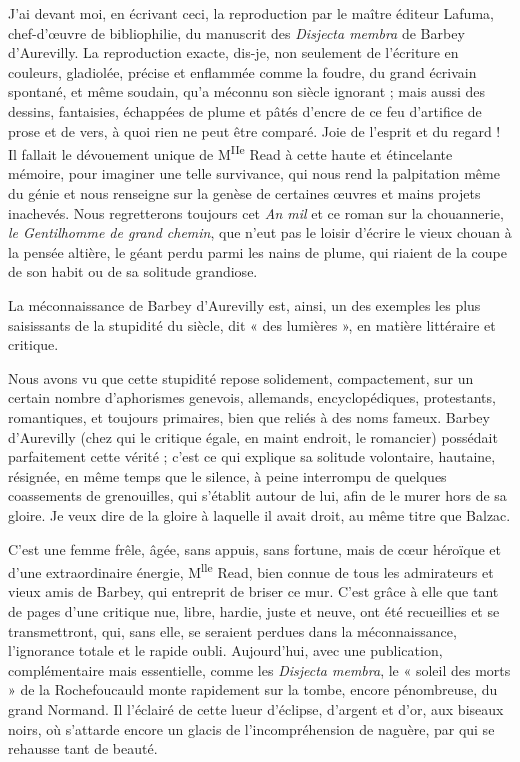 \documentclass[french,twoside]{book} %
\begin{document}
J’ai devant moi, en écrivant ceci, la reproduction par le maître éditeur Lafuma, chef-d’œuvre de bibliophilie, du manuscrit des {\itshape Disjecta membra} de Barbey d’Aurevilly. La reproduction exacte, dis-je, non seulement de l’écriture en couleurs, gladiolée, précise et enflammée comme la foudre, du grand écrivain spontané, et même soudain, qu’a méconnu son siècle ignorant ; mais aussi des dessins, fantaisies, échappées de plume et pâtés d’encre de ce feu d’artifice de prose et de vers, à quoi rien ne peut être comparé. Joie de l’esprit et du regard ! Il fallait le dévouement unique de M\textsuperscript{IIe} Read à cette haute et étincelante mémoire, pour imaginer une telle survivance, qui nous rend la palpitation même du génie et nous renseigne sur la genèse de certaines œuvres et mains projets inachevés. Nous regretterons toujours cet {\itshape An mil} et ce roman sur la chouannerie, {\itshape le Gentilhomme de grand chemin}, que n’eut pas le loisir d’écrire le vieux chouan à la pensée altière, le géant perdu parmi les nains de plume, qui riaient de la coupe de son habit ou de sa solitude grandiose.\par
La méconnaissance de Barbey d’Aurevilly est, ainsi, un des exemples les plus saisissants de la stupidité du siècle, dit « des lumières », en matière littéraire et critique.\par
Nous avons vu que cette stupidité repose solidement, compactement, sur un certain nombre d’aphorismes genevois, allemands, encyclopédiques, protestants, romantiques, et toujours primaires, bien que reliés à des noms fameux. Barbey d’Aurevilly (chez qui le critique égale, en maint endroit, le romancier) possédait parfaitement cette vérité ; c’est ce qui explique sa solitude volontaire, hautaine, résignée, en même temps que le silence, à peine interrompu de quelques coassements de grenouilles, qui s’établit autour de lui, afin de le murer hors de sa gloire. Je veux dire de la gloire à laquelle il avait droit, au même titre que Balzac.\par
C’est une femme frêle, âgée, sans appuis, sans fortune, mais de cœur héroïque et d’une extraordinaire énergie, M\textsuperscript{lle} Read, bien connue de tous les admirateurs et vieux amis de Barbey, qui entreprit de briser ce mur. C’est grâce à elle que tant de pages d’une critique nue, libre, hardie, juste et neuve, ont été recueillies et se transmettront, qui, sans elle, se seraient perdues dans la méconnaissance, l’ignorance totale et le rapide oubli. Aujourd’hui, avec une publication, complémentaire mais essentielle, comme les {\itshape Disjecta membra}, le « soleil des morts » de la Rochefoucauld monte rapidement sur la tombe, encore pénombreuse, du grand Normand. Il l’éclairé de cette lueur d’éclipse, d’argent et d’or, aux biseaux noirs, où s’attarde encore un glacis de l’incompréhension de naguère, par qui se rehausse tant de beauté.\par
\end{document}
